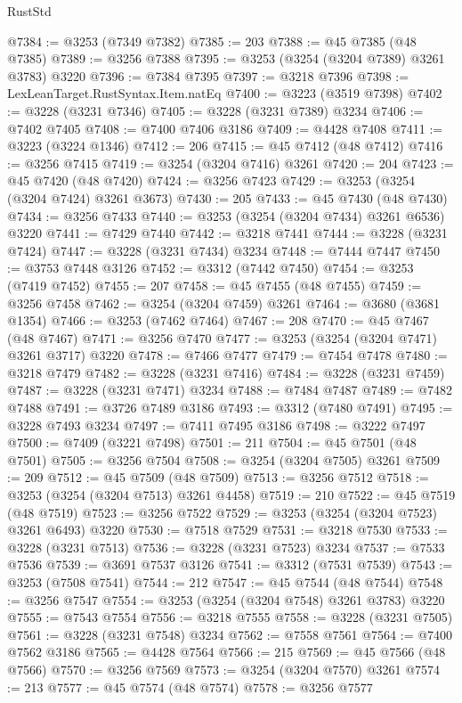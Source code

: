 \begin{lexlean}{RustStd}
\begin{coremodule}
@7384 := @3253 (@7349 @7382)
@7385 := 203
@7388 := @45 @7385 (@48 @7385)
@7389 := @3256 @7388
@7395 := @3253 (@3254 (@3204 @7389) @3261 @3783) @3220
@7396 := @7384 @7395
@7397 := @3218 @7396
@7398 := LexLeanTarget.RustSyntax.Item.natEq
@7400 := @3223 (@3519 @7398)
@7402 := @3228 (@3231 @7346)
@7405 := @3228 (@3231 @7389) @3234
@7406 := @7402 @7405
@7408 := @7400 @7406 @3186
@7409 := @4428 @7408
@7411 := @3223 (@3224 @1346)
@7412 := 206
@7415 := @45 @7412 (@48 @7412)
@7416 := @3256 @7415
@7419 := @3254 (@3204 @7416) @3261
@7420 := 204
@7423 := @45 @7420 (@48 @7420)
@7424 := @3256 @7423
@7429 := @3253 (@3254 (@3204 @7424) @3261 @3673)
@7430 := 205
@7433 := @45 @7430 (@48 @7430)
@7434 := @3256 @7433
@7440 := @3253 (@3254 (@3204 @7434) @3261 @6536) @3220
@7441 := @7429 @7440
@7442 := @3218 @7441
@7444 := @3228 (@3231 @7424)
@7447 := @3228 (@3231 @7434) @3234
@7448 := @7444 @7447
@7450 := @3753 @7448 @3126
@7452 := @3312 (@7442 @7450)
@7454 := @3253 (@7419 @7452)
@7455 := 207
@7458 := @45 @7455 (@48 @7455)
@7459 := @3256 @7458
@7462 := @3254 (@3204 @7459) @3261
@7464 := @3680 (@3681 @1354)
@7466 := @3253 (@7462 @7464)
@7467 := 208
@7470 := @45 @7467 (@48 @7467)
@7471 := @3256 @7470
@7477 := @3253 (@3254 (@3204 @7471) @3261 @3717) @3220
@7478 := @7466 @7477
@7479 := @7454 @7478
@7480 := @3218 @7479
@7482 := @3228 (@3231 @7416)
@7484 := @3228 (@3231 @7459)
@7487 := @3228 (@3231 @7471) @3234
@7488 := @7484 @7487
@7489 := @7482 @7488
@7491 := @3726 @7489 @3186
@7493 := @3312 (@7480 @7491)
@7495 := @3228 @7493 @3234
@7497 := @7411 @7495 @3186
@7498 := @3222 @7497
@7500 := @7409 (@3221 @7498)
@7501 := 211
@7504 := @45 @7501 (@48 @7501)
@7505 := @3256 @7504
@7508 := @3254 (@3204 @7505) @3261
@7509 := 209
@7512 := @45 @7509 (@48 @7509)
@7513 := @3256 @7512
@7518 := @3253 (@3254 (@3204 @7513) @3261 @4458)
@7519 := 210
@7522 := @45 @7519 (@48 @7519)
@7523 := @3256 @7522
@7529 := @3253 (@3254 (@3204 @7523) @3261 @6493) @3220
@7530 := @7518 @7529
@7531 := @3218 @7530
@7533 := @3228 (@3231 @7513)
@7536 := @3228 (@3231 @7523) @3234
@7537 := @7533 @7536
@7539 := @3691 @7537 @3126
@7541 := @3312 (@7531 @7539)
@7543 := @3253 (@7508 @7541)
@7544 := 212
@7547 := @45 @7544 (@48 @7544)
@7548 := @3256 @7547
@7554 := @3253 (@3254 (@3204 @7548) @3261 @3783) @3220
@7555 := @7543 @7554
@7556 := @3218 @7555
@7558 := @3228 (@3231 @7505)
@7561 := @3228 (@3231 @7548) @3234
@7562 := @7558 @7561
@7564 := @7400 @7562 @3186
@7565 := @4428 @7564
@7566 := 215
@7569 := @45 @7566 (@48 @7566)
@7570 := @3256 @7569
@7573 := @3254 (@3204 @7570) @3261
@7574 := 213
@7577 := @45 @7574 (@48 @7574)
@7578 := @3256 @7577

\end{coremodule}
\end{lexlean}
